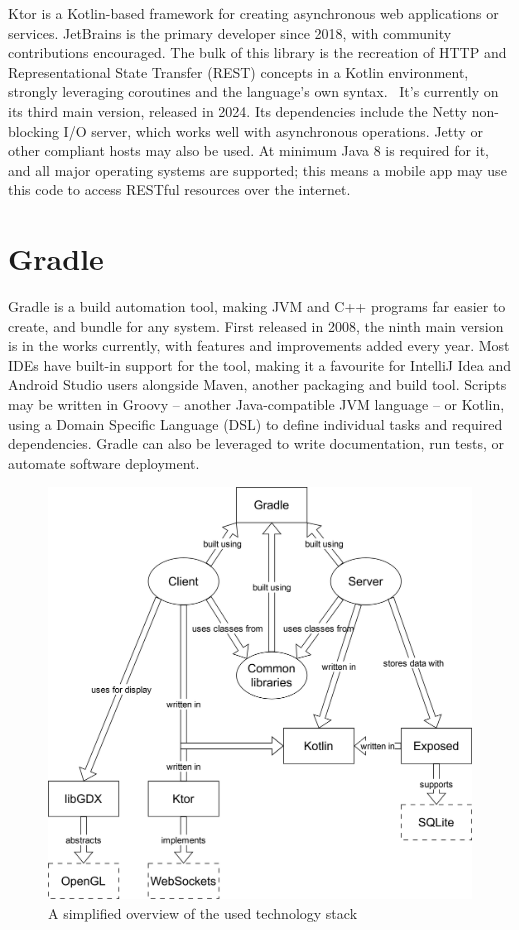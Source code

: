 Ktor is a Kotlin-based framework for creating asynchronous web applications or services. JetBrains is the primary developer since 2018, with community contributions encouraged. The bulk of this library is the recreation of HTTP and Representational State Transfer (REST) concepts in a Kotlin environment, strongly leveraging coroutines and the language's own syntax.~\cite{KtorDocs} It's currently on its third main version, released in 2024. Its dependencies include the Netty non-blocking I/O server, which works well with asynchronous operations. Jetty or other compliant hosts may also be used. At minimum Java 8 is required for it, and all major operating systems are supported; this means a mobile app may use this code to access RESTful resources over the internet.



\section{Gradle}

Gradle is a build automation tool, making JVM and C++ programs far easier to create, and bundle for any system.\cite{GradleDocs} First released in 2008, the ninth main version is in the works currently, with features and improvements added every year. Most IDEs have built-in support for the tool, making it a favourite for IntelliJ Idea and Android Studio users alongside Maven, another packaging and build tool. Scripts may be written in Groovy -- another Java-compatible JVM language -- or Kotlin, using a Domain Specific Language (DSL) to define individual tasks and required dependencies. Gradle can also be leveraged to write documentation, run tests, or automate software deployment.

\begin{figure}[!ht]
    \centering
    \includegraphics[width=140mm, keepaspectratio]{images/tech-stack.png}
    \caption{A simplified overview of the used technology stack}
\end{figure}
